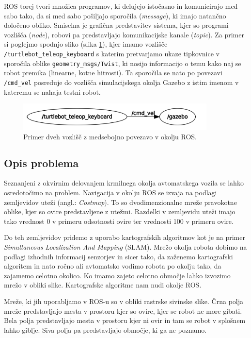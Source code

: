 \documentclass[10pt,a4paper]{article}
\begin{document}
ROS torej tvori množica programov, ki delujejo istočasno in komunicirajo med sabo tako, da si med sabo pošiljajo sporočila (\textit{message}), ki imajo natančno določeno obliko. Smiselna je grafična predstavitev sistema, kjer so programi vozlišča (\textit{node}), robovi pa predstavljajo komunikacijske kanale (\textit{topic}). Za primer si poglejmo spodnjo sliko (slika \ref{fig:sl1}), kjer imamo vozlišče \verb|/turtlebot_teleop_keyboard| s katerim pretvarjamo ukaze tipkovnice v sporočila oblike \verb|geometry_msgs/Twist|, ki nosijo informacijo o temu kako naj se robot premika (linearne, kotne hitrosti). Ta sporočila se nato po povezavi \verb|/cmd_vel| posreduje do vozlišča simulacijskega okolja Gazebo z istim imenom v kateremu se nahaja testni robot.

\begin{figure}[H]
	\centering
	\includegraphics[width=10cm]{pic/ros.png}
	\caption{Primer dveh vozlišč z medsebojno povezavo v okolju ROS.}
	\label{fig:sl1}
\end{figure}

\subsection{Opis problema}

Seznanjeni z okvirnim delovanjem krmilnega okolja avtomatskega vozila se lahko osredotočimo na problem. Navigacija v okolju ROS se izvaja na podlagi zemljevidov uteži (angl.: \textit{Costmap}). To so dvodimenzionalne mreže pravokotne oblike, kjer so ovire predstavljene z utežmi. Razdelki v zemljevidu uteži imajo tako vrednost 0 v primeru odsotnosti ovire ter vrednosti 100 v primeru ovire.

Do teh zemljevidov pridemo z uporabo kartografskih algoritmov kot je na primer \textit{Simultaneous Localization And Mapping} (SLAM). Mrežo okolja robota dobimo na podlagi izhodnih informacij senzorjev in sicer tako, da zaženemo kartografski algoritem in nato ročno ali avtomatsko vodimo robota po okolju tako, da zajamemo celotno okolico. Ko imamo zajeto celotno območje lahko izvozimo mrežo v obliki slike. Kartografske algoritme nam nudi okolje ROS. 

Mreže, ki jih uporabljamo v ROS-u so v obliki rastrske sivinske slike. Črna polja mreže predstavljajo mesta v prostoru kjer so ovire, kjer se robot ne more gibati. Bela polja predstavljajo mesta v prostoru kjer ni ovir in tam se robot v splošnem lahko giblje. Siva polja pa predstavljajo območje, ki ga ne poznamo.
\end{document}
